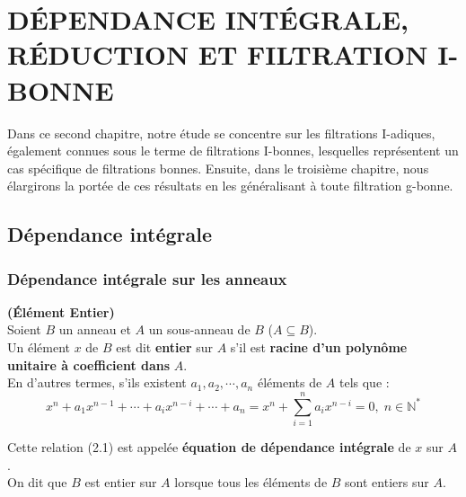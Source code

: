 \chapter{DÉPENDANCE INTÉGRALE, RÉDUCTION ET FILTRATION I-BONNE}

Dans ce second chapitre, notre étude se concentre sur les filtrations I-adiques, également connues sous le terme de filtrations I-bonnes, lesquelles représentent un cas spécifique de filtrations bonnes. Ensuite, dans le troisième chapitre, nous élargirons la portée de ces résultats en les généralisant à toute filtration g-bonne.

\section{Dépendance intégrale}
\subsection{Dépendance intégrale sur les anneaux}
\begin{madefinition}\textbf{(Élément Entier)}\cite{2} \\
	Soient $B$ un anneau et $A$ un sous-anneau de $B$ ($A \subseteq B$).\\
	Un élément $x$ de $B$ est dit \textbf{entier} sur $A$ s'il est \textbf{racine d'un polynôme unitaire à coefficient dans} $A$.\\
	En d'autres termes, s'ils existent $a_1, a_2, \cdots , a_n$ éléments de $A$ tels que :\\
	\begin{equation}
		 x^n + a_1 x^{n-1} +\cdots+a_i x^{n-i} +\cdots + a_n = x^n + \sum_{i=1}^{n} a_i x^{n-i} = 0, \; n \in \mathbb{N^*}
	\end{equation}

	Cette relation (2.1) est appelée \textbf{équation de dépendance intégrale} de $x$ sur $A$.\\
	On dit que $B$ est entier sur $A$ lorsque tous les éléments de $B$ sont entiers sur $A$.
\end{madefinition}


